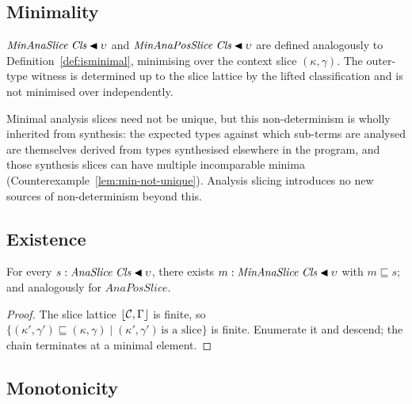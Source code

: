 \subsection{\yo Minimality}
\label{sec:ana-minimality}

$\mathit{MinAnaSlice}\;\mathit{Cls} \mathbin{\blacktriangleleft} \upsilon$ and $\mathit{MinAnaPosSlice}\;\mathit{Cls} \mathbin{\blacktriangleleft} \upsilon$ are defined analogously to Definition~\ref{def:isminimal}, minimising over the context slice $(\kappa, \gamma)$. The outer-type witness is determined up to the slice lattice by the lifted classification and is not minimised over independently.

Minimal analysis slices need not be unique, but this non-determinism is wholly inherited from synthesis: the expected types against which sub-terms are analysed are themselves derived from types synthesised elsewhere in the program, and those synthesis slices can have multiple incomparable minima (Counterexample~\ref{lem:min-not-unique}). Analysis slicing introduces no new sources of non-determinism beyond this.

\subsection{\po Existence}
\label{sec:ana-min-exists}

\begin{majortheorembox}
%
\begin{theorem}\label{thm:ana-min-exists}
For every $s : \mathit{AnaSlice}\;\mathit{Cls} \mathbin{\blacktriangleleft} \upsilon$, there exists $m : \mathit{MinAnaSlice}\;\mathit{Cls} \mathbin{\blacktriangleleft} \upsilon$ with $m \sqsubseteq s$; and analogously for $\mathit{AnaPosSlice}$.
\end{theorem}
\end{majortheorembox}

\begin{proof}
The slice lattice $\lfloor\mathcal{C}, \Gamma\rfloor$ is finite, so $\{(\kappa', \gamma') \sqsubseteq (\kappa, \gamma) \mid (\kappa', \gamma')\,\text{is a slice}\}$ is finite. Enumerate it and descend; the chain terminates at a minimal element.
\end{proof}

\subsection{\po Monotonicity}
\label{sec:ana-monotonicity}

